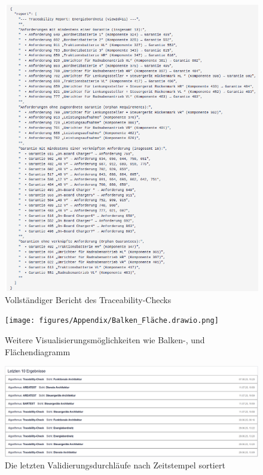 \begin{figure}[h!]
  \centering
  \includegraphics[width=\textwidth]{figures/06Evaluation/Bildschirmfoto vom 2025-06-29 13-23-12.png}
  \caption{Vollständiger Bericht des Traceability-Checks}
  \label{fig:fullresult}
\end{figure}

\begin{figure}[h!]
  \centering
  \texttt{[image: figures/Appendix/Balken\_Fläche.drawio.png]}
  \caption{Weitere Visualisierungsmöglichkeiten wie Balken-, und Flächendiagramm}
  \label{fig:metricvis}
\end{figure}

\begin{figure}
  \centering
  \includegraphics[width=\textwidth]{figures/Appendix/Bildschirmfoto vom 2025-08-10 14-10-31.png}
  \caption{Die letzten Validierungsdurchläufe nach Zeitstempel sortiert}
  \label{fig:historie}
\end{figure}